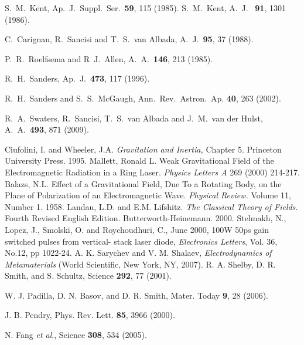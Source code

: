 \begin{thebibliography}{10}
 S.~M.~Kent, Ap.~J.~Suppl.~Ser.~{\bf 59}, 115 (1985).
 S.~M.~Kent, A.~J.~ {\bf 91}, 1301 (1986).


 C.~Carignan, R.~Sancisi and  T.~S.~van Albada, A.~J.~{\bf 95}, 37 (1988).

 P.~R.~Roelfsema and R~J.~Allen, A.~A.~{\bf 146}, 213 (1985).

 R.~H.~Sanders, Ap.~J.~{\bf 473}, 117 (1996).

 R.~H.~Sanders and S.~S.~McGaugh, Ann.~Rev.~Astron.~Ap. {\bf 40}, 263 (2002).

 R.~A.~Swaters, R.~Sancisi, T.~S.~van Albada and J.~M.~van der Hulst, A.~A.~{\bf 493}, 871 (2009).



	  Ciufolini, I. and Wheeler, J.A. \emph{Gravitation and Inertia,} Chapter 5. Princeton University Press.  1995.
		Mallett, Ronald L.  Weak Gravitational Field of the Electromagnetic
		Radiation in a Ring Laser.  \emph{Physics Letters A} 269 (2000) 214-217.
		Balazs, N.L.  Effect of a Gravitational Field, Due To a Rotating Body,
		on the Plane of Polarization of an Electromagnetic Wave.  \emph{Physical
		Review.}  Volume 11, Number 1.  1958.
		Landau, L.D. and E.M. Lifshitz.  \emph{The Classical Theory of Fields.}
		Fourth Revised English Edition.  Butterworth-Heinemann.  2000.
  Stelmakh, N., Lopez, J., Smolski, O. and Roychoudhuri, C., June 2000, 100W 50ps gain switched pulses from vertical- stack laser diode, \emph{Electronics Letters}, Vol. 36, No.12, pp 1022-24.
  A. K. Sarychev and V. M. Shalaev, \textit{Electrodynamics of Metamaterials} (World Scientific, New York, NY, 2007).
R. A. Shelby, D. R. Smith, and S. Schultz, Science \textbf{292}, 77 (2001).

W. J. Padilla, D. N. Basov, and D. R. Smith, Mater. Today \textbf{9}, 28 (2006).

J. B. Pendry, Phys. Rev. Lett. \textbf{85}, 3966 (2000).

N. Fang \textit{et al}., Science \textbf{308}, 534 (2005).


\end{thebibliography}
